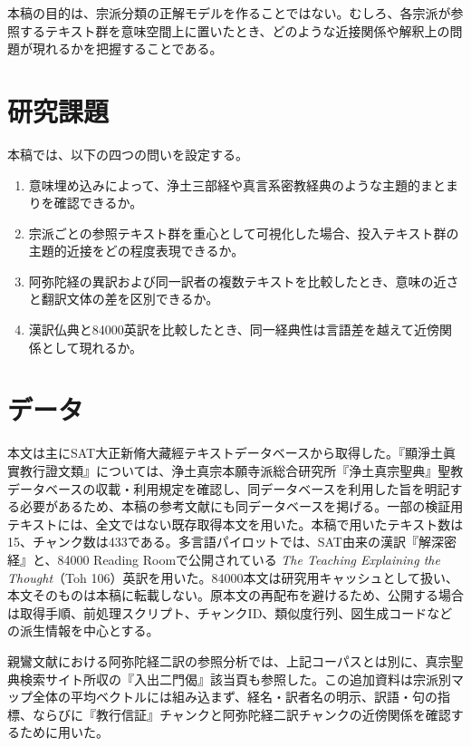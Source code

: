 \documentclass[uplatex,dvipdfmx,11pt,a4paper]{jsarticle}
\begin{document}
本稿の目的は、宗派分類の正解モデルを作ることではない。むしろ、各宗派が参照するテキスト群を意味空間上に置いたとき、どのような近接関係や解釈上の問題が現れるかを把握することである。

\section{研究課題}

本稿では、以下の四つの問いを設定する。

\begin{enumerate}
  \item 意味埋め込みによって、浄土三部経や真言系密教経典のような主題的まとまりを確認できるか。
  \item 宗派ごとの参照テキスト群を重心として可視化した場合、投入テキスト群の主題的近接をどの程度表現できるか。
  \item 阿弥陀経の異訳および同一訳者の複数テキストを比較したとき、意味の近さと翻訳文体の差を区別できるか。
  \item 漢訳仏典と84000英訳を比較したとき、同一経典性は言語差を越えて近傍関係として現れるか。
\end{enumerate}

\section{データ}

本文は主にSAT大正新脩大藏經テキストデータベースから取得した。『顯淨土眞實教行證文類』については、浄土真宗本願寺派総合研究所『浄土真宗聖典』聖教データベースの収載・利用規定を確認し、同データベースを利用した旨を明記する必要があるため、本稿の参考文献にも同データベースを掲げる。一部の検証用テキストには、全文ではない既存取得本文を用いた。本稿で用いたテキスト数は15、チャンク数は433である。多言語パイロットでは、SAT由来の漢訳『解深密経』と、84000 Reading Roomで公開されている \textit{The Teaching Explaining the Thought}（Toh 106）英訳を用いた。84000本文は研究用キャッシュとして扱い、本文そのものは本稿に転載しない。原本文の再配布を避けるため、公開する場合は取得手順、前処理スクリプト、チャンクID、類似度行列、図生成コードなどの派生情報を中心とする。

親鸞文献における阿弥陀経二訳の参照分析では、上記コーパスとは別に、真宗聖典検索サイト所収の『入出二門偈』該当頁も参照した。この追加資料は宗派別マップ全体の平均ベクトルには組み込まず、経名・訳者名の明示、訳語・句の指標、ならびに『教行信証』チャンクと阿弥陀経二訳チャンクの近傍関係を確認するために用いた。
\end{document}
